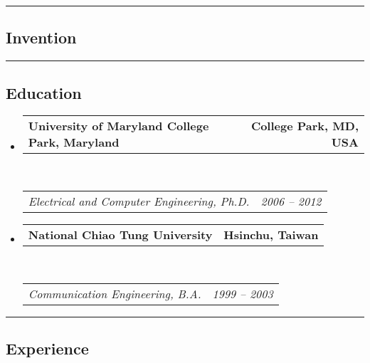 \documentclass[10pt,letterpaper]{article}
\makeatletter
\newcommand{\headerrow}[2]
{\begin{tabular*}{\linewidth}{l@{\extracolsep{\fill}}r}
	#1 &
	#2 \\
\end{tabular*}}
\makeatother
\begin{document}
\hrule
\vspace{-0.4em}
\subsection*{Invention}
\begin{itemize}

\end{itemize}

\hrule
\vspace{-0.4em}
\subsection*{Education}

\begin{itemize}
	\parskip=0.1em

	\item
	\headerrow
		{\textbf{University of Maryland College Park, Maryland}}
		{\textbf{College Park, MD, USA}}
	\\
	\headerrow
		{\emph{Electrical and Computer Engineering, Ph.D.}}
		{\emph{2006 -- 2012}}
	\item
	\headerrow
		{\textbf{National Chiao Tung University}}
		{\textbf{Hsinchu, Taiwan}}
	\\
	\headerrow
		{\emph{Communication Engineering, B.A.}}
		{\emph{1999 -- 2003}}

\end{itemize}


\hrule
\vspace{-0.4em}
\subsection*{Experience}
\end{document}
